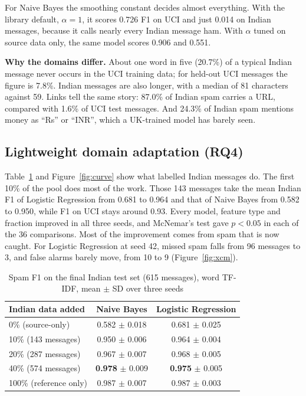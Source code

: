 For Naive Bayes the smoothing constant decides almost everything. With the library default, $\alpha=1$, it scores 0.726 F1 on UCI and just 0.014 on Indian messages, because it calls nearly every Indian message ham. With $\alpha$ tuned on source data only, the same model scores 0.906 and 0.551.

\textbf{Why the domains differ.} About one word in five (20.7\%) of a typical Indian message never occurs in the UCI training data; for held-out UCI messages the figure is 7.8\%. Indian messages are also longer, with a median of 81 characters against 59. Links tell the same story: 87.0\% of Indian spam carries a URL, compared with 1.6\% of UCI test messages. And 24.3\% of Indian spam mentions money as ``Rs'' or ``INR'', which a UK-trained model has barely seen.

\subsection{Lightweight domain adaptation (RQ4)}
Table~\ref{tab:adapt} and Figure~\ref{fig:curve} show what labelled Indian messages do. The first 10\% of the pool does most of the work. Those 143 messages take the mean Indian F1 of Logistic Regression from 0.681 to 0.964 and that of Naive Bayes from 0.582 to 0.950, while F1 on UCI stays around 0.93. Every model, feature type and fraction improved in all three seeds, and McNemar's test gave $p<0.05$ in each of the 36 comparisons. Most of the improvement comes from spam that is now caught. For Logistic Regression at seed 42, missed spam falls from 96 messages to 3, and false alarms barely move, from 10 to 9 (Figure~\ref{fig:xcm}).

\begin{table}[H]
\centering
\caption{Spam F1 on the final Indian test set (615 messages), word TF-IDF, mean $\pm$ SD over three seeds}
\label{tab:adapt}
\begin{tabular}{|l|c|c|}
\hline
\textbf{Indian data added} & \textbf{Naive Bayes} & \textbf{Logistic Regression} \\
\hline
0\% (source-only) & 0.582 $\pm$ 0.018 & 0.681 $\pm$ 0.025 \\
\hline
10\% (143 messages) & 0.950 $\pm$ 0.006 & 0.964 $\pm$ 0.004 \\
\hline
20\% (287 messages) & 0.967 $\pm$ 0.007 & 0.968 $\pm$ 0.005 \\
\hline
40\% (574 messages) & \textbf{0.978} $\pm$ 0.009 & \textbf{0.975} $\pm$ 0.005 \\
\hline
100\% (reference only) & 0.987 $\pm$ 0.007 & 0.987 $\pm$ 0.003 \\
\hline
\end{tabular}
\end{table}

